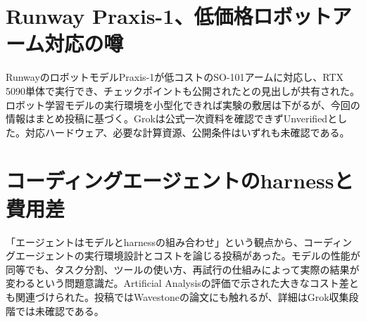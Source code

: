 \section{Runway Praxis-1、低価格ロボットアーム対応の噂}
RunwayのロボットモデルPraxis-1が低コストのSO-101アームに対応し、RTX 5090単体で実行でき、チェックポイントも公開されたとの見出しが共有された。ロボット学習モデルの実行環境を小型化できれば実験の敷居は下がるが、今回の情報はまとめ投稿に基づく。Grokは公式一次資料を確認できずUnverifiedとした。対応ハードウェア、必要な計算資源、公開条件はいずれも未確認である。

\section{コーディングエージェントのharnessと費用差}
「エージェントはモデルとharnessの組み合わせ」という観点から、コーディングエージェントの実行環境設計とコストを論じる投稿があった。モデルの性能が同等でも、タスク分割、ツールの使い方、再試行の仕組みによって実際の結果が変わるという問題意識だ。Artificial Analysisの評価で示された大きなコスト差とも関連づけられた。投稿ではWavestoneの論文にも触れるが、詳細はGrok収集段階では未確認である。

